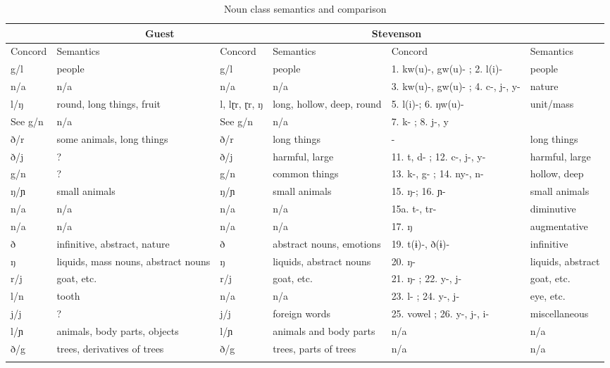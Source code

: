 \begin{longtable}{lp{2cm}lp{2cm}p{1.5cm}p{2cm}}
    \lsptoprule
  \multicolumn{2}{c}{Thotegovela Moro} &    \multicolumn{2}{c}{Guest} &   \multicolumn{2}{c}{Stevenson} \\
\midrule
Concord & Semantics & Concord & Semantics &Concord & Semantics \\
\midrule
g/l	&	people	&	g/l		&	people		&	1. kw(u)-, gw(u)- ; 2. l(i)- 	&	people \\
n/a	&	n/a		&	n/a		&	n/a		&	3. kw(u)-, gw(u)- ; 4. c-, j-, y- &	 nature \\
l/ŋ	&	round, long things, fruit 	&		l, lɽr, ɽr, ŋ&	long, hollow, deep, round		&	5. l(i)-; 6. ŋw(u)-
	&	 unit/mass \\
See g/n		&	 n/a		&	See g/n	&		n/a		&	 7. k- ; 8. j-, y &	\\
ð/r		&	some animals, long things &		ð/r	&	 long things	&	- &		long things \\
ð/j &	?	&	ð/j&		harmful, large	&	11. t, d- ; 12. c-, j-, y- &	 harmful, large\\
g/n	&	? 	&		g/n	& common things	&	13. k-, g- ; 14. ny-, n-	
&	 hollow, deep \\
ŋ/ɲ	&	 small animals	&	ŋ/ɲ	& small animals	&	 15. ŋ-; 
16. ɲ-	&	 small animals \\
n/a	&	 n/a &		n/a &	n/a		&	15a. t-, tr-		&	 diminutive \\
n/a	&	 n/a		&	n/a		&	n/a		&	17. ŋ		&	augmentative \\
ð	&	 infinitive, abstract, nature		&	ð		&	abstract nouns, emotions		&	19. t(ɨ)-, ð(ɨ)-		&	infinitive \\
ŋ	&	liquids, mass nouns, abstract nouns		&	ŋ		&	liquids, abstract nouns		&	20. ŋ-		&	liquids, abstract \\
r/j	&	 goat, etc.	&		r/j	& goat, etc.		&	21. ŋ- ;
22. y-, j- 	&		goat, etc. \\
l/n	&	 tooth		&	n/a		&	n/a		&	23. l- ;
24. y-, j-		&	eye, etc. \\
j/j	&	 ? 	&		j/j		&	foreign words		&	25. vowel ; 26. y-, j-, i-		&	 miscellaneous\\
l/ɲ	&	 animals, body parts, objects	&	 	l/ɲ		&	 animals and body parts		&	 n/a	&	 	n/a \\
ð/g	&	 trees, derivatives of trees		&	 ð/g		&	 trees, parts of trees		&	 n/a		&	 n/a \\
\lspbottomrule 
  \caption{Noun class semantics and comparison}
  \label{tab:ch6:3}
\end{longtable}

